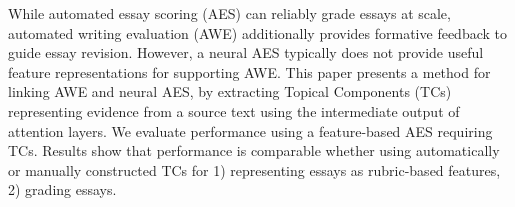 While automated essay scoring (AES) can reliably grade essays at scale, automated writing evaluation (AWE) additionally provides formative feedback to guide essay revision. However, a neural AES typically does not provide useful feature representations for supporting AWE. This paper presents a method for linking AWE and neural AES, by extracting Topical Components (TCs) representing evidence from a source text using the intermediate output of attention layers. We evaluate performance using a feature-based AES requiring TCs. Results show that performance is comparable whether using automatically or manually constructed TCs for 1) representing essays as rubric-based features, 2) grading essays.
